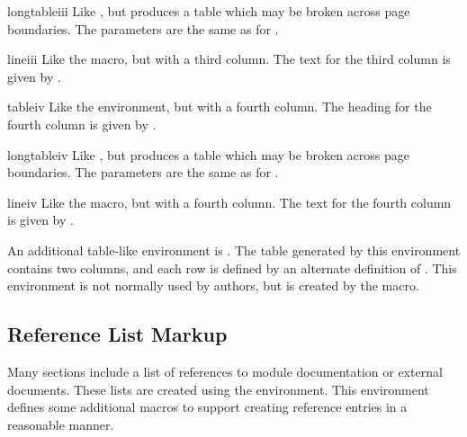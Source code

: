 \documentclass{howto}
\begin{document}
    \begin{envdesc}{longtableiii}{\unspecified}
      Like , but produces a table which may be broken
      across page boundaries.  The parameters are the same as for
      .
    \end{envdesc}

    \begin{macrodesc}{lineiii}{}
      Like the  macro, but with a third column.  The
      text for the third column is given by .
    \end{macrodesc}

    \begin{envdesc}{tableiv}{}
      Like the  environment, but with a fourth column.
      The heading for the fourth column is given by .
    \end{envdesc}

    \begin{envdesc}{longtableiv}{\unspecified}
      Like , but produces a table which may be broken
      across page boundaries.  The parameters are the same as for
      .
    \end{envdesc}

    \begin{macrodesc}{lineiv}{}
      Like the  macro, but with a fourth column.  The
      text for the fourth column is given by .
    \end{macrodesc}


    An additional table-like environment is .  The
    table generated by this environment contains two columns, and each
    row is defined by an alternate definition of
    .  This environment is not normally used by
    authors, but is created by the  macro.


  \subsection{Reference List Markup \label{references}}

    Many sections include a list of references to module documentation
    or external documents.  These lists are created using the
     environment.  This environment defines some
    additional macros to support creating reference entries in a
    reasonable manner.
\end{document}

